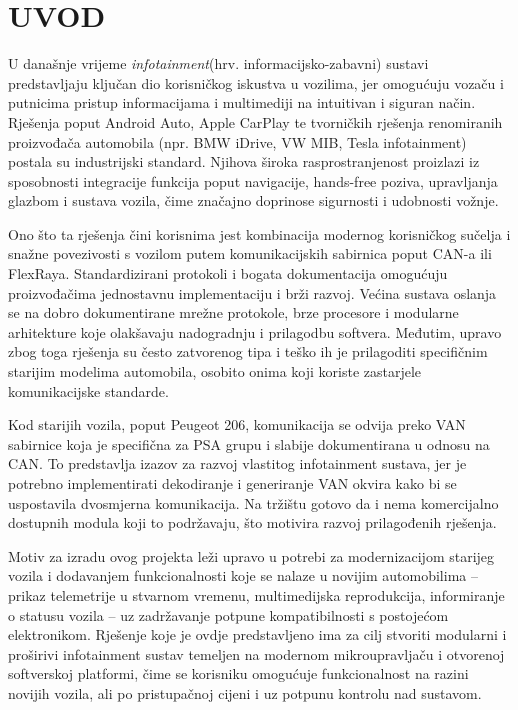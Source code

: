 \section{UVOD}

U današnje vrijeme \textit{infotainment}(hrv. informacijsko-zabavni) sustavi predstavljaju ključan dio korisničkog iskustva u vozilima, jer omogućuju vozaču i putnicima pristup informacijama i multimediji na intuitivan i siguran način. Rješenja poput Android Auto, Apple CarPlay te tvorničkih rješenja renomiranih proizvođača automobila (npr. BMW iDrive, VW MIB, Tesla infotainment) postala su industrijski standard. Njihova široka rasprostranjenost proizlazi iz sposobnosti integracije funkcija poput navigacije, hands-free poziva, upravljanja glazbom i sustava vozila, čime značajno doprinose sigurnosti i udobnosti vožnje.

Ono što ta rješenja čini korisnima jest kombinacija modernog korisničkog sučelja i snažne povezivosti s vozilom putem komunikacijskih sabirnica poput CAN-a ili FlexRaya. Standardizirani protokoli i bogata dokumentacija omogućuju proizvođačima jednostavnu implementaciju i brži razvoj. Većina sustava oslanja se na dobro dokumentirane mrežne protokole, brze procesore i modularne arhitekture koje olakšavaju nadogradnju i prilagodbu softvera. Međutim, upravo zbog toga rješenja su često zatvorenog tipa i teško ih je prilagoditi specifičnim starijim modelima automobila, osobito onima koji koriste zastarjele komunikacijske standarde.

Kod starijih vozila, poput Peugeot 206, komunikacija se odvija preko VAN sabirnice koja je specifična za PSA grupu i slabije dokumentirana u odnosu na CAN. To predstavlja izazov za razvoj vlastitog infotainment sustava, jer je potrebno implementirati dekodiranje i generiranje VAN okvira kako bi se uspostavila dvosmjerna komunikacija. Na tržištu gotovo da i nema komercijalno dostupnih modula koji to podržavaju, što motivira razvoj prilagođenih rješenja.

Motiv za izradu ovog projekta leži upravo u potrebi za modernizacijom starijeg vozila i dodavanjem funkcionalnosti koje se nalaze u novijim automobilima – prikaz telemetrije u stvarnom vremenu, multimedijska reprodukcija, informiranje o statusu vozila – uz zadržavanje potpune kompatibilnosti s postojećom elektronikom. Rješenje koje je ovdje predstavljeno ima za cilj stvoriti modularni i proširivi infotainment sustav temeljen na modernom mikroupravljaču i otvorenoj softverskoj platformi, čime se korisniku omogućuje funkcionalnost na razini novijih vozila, ali po pristupačnoj cijeni i uz potpunu kontrolu nad sustavom.

